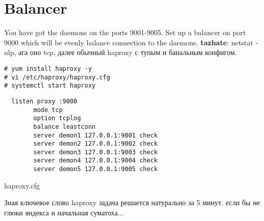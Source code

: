 \documentclass[a4paper,10pt]{report}
\begin{document}
\chapter{Balancer}
You have got the daemons on the ports 9001-9005.
\newline  
Set up a balancer on port 9000 which will be evenly balance connection to the daemons.
\newline\newline
\textbf{tazhate}:
\newline
netstat - nlp, ага оно tcp, далее обычный haproxy с тупым и банальным конфигом.

\begin{verbatim}
# yum install haproxy -y
# vi /etc/haproxy/haproxy.cfg
# systemctl start haproxy
\end{verbatim}
\begin{listing}[H]
  \begin{verbatim}
  listen proxy :9000
        mode tcp
        option tcplog
        balance leastconn
        server demon1 127.0.0.1:9001 check
        server demon2 127.0.0.1:9002 check
        server demon3 127.0.0.1:9003 check
        server demon4 127.0.0.1:9004 check
        server demon5 127.0.0.1:9005 check
  \end{verbatim}
  \caption{haproxy.cfg}
  \label{lst:haproxy.cfg}
\end{listing}
Зная ключевое слово haproxy задача решается натурально за 5 минут. если бы не глюки яндекса и начальная суматоха...
\end{document}
